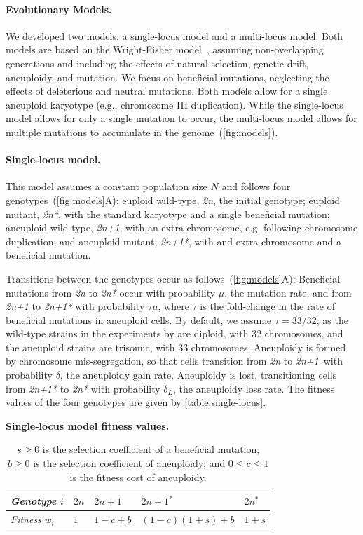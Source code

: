 \documentclass[12pt]{extarticle}
\newcommand{\euwt}{\emph{2n}}
\newcommand{\anwt}{\emph{2n+1}}
\newcommand{\eumt}{\emph{2n*}}
\newcommand{\anmt}{\emph{2n+1*}}
\begin{document}
\paragraph*{Evolutionary Models.}
We developed two models: a single-locus model and a multi-locus model. 
Both models are based on the Wright-Fisher model~\citep{Otto2007}, assuming non-overlapping generations and including the effects of natural selection, genetic drift, aneuploidy, and mutation. 
We focus on beneficial mutations, neglecting the effects of deleterious and neutral mutations. Both models allow for a single aneuploid karyotype (e.g., chromosome III duplication).
While the single-locus model allows for only a single mutation to occur, the
multi-locus model allows for multiple mutations to accumulate in the genome~(\autoref{fig:models}).

\paragraph*{Single-locus model.}
This model assumes a constant population size $N$ and follows four genotypes~(\autoref{fig:models}A): euploid wild-type, \euwt, the initial genotype; 
euploid mutant, \eumt, with the standard karyotype and a single beneficial mutation; 
aneuploid wild-type, \anwt, with an extra chromosome, e.g. following chromosome duplication; and
aneuploid mutant, \anmt, with and extra chromosome and a beneficial mutation. 

Transitions between the genotypes occur as follows~(\autoref{fig:models}A): Beneficial mutations from \euwt\; to \eumt\; occur with probability $\mu$, the mutation rate, and from \anwt\; to \anmt\; with probability $\tau \mu$, where $\tau$ is the fold-change in the rate of beneficial mutations in aneuploid cells. By default, we assume $\tau=33/32$, as the wild-type \yeast strains in the experiments by \citep{Yona2012} are diploid, with 32 chromosomes, and the aneuploid strains are trisomic, with 33 chromosomes.
Aneuploidy is formed by chromosome mis-segregation, so that cells transition from \euwt\; to \anwt\ with probability $\delta$, the aneuploidy gain rate.
Aneuploidy is lost, transitioning cells from \anmt\; to \eumt\; with probability $\delta_L$, the aneuploidy loss rate.
The fitness values of the four genotypes are given by \autoref{table:single-locus}.

\begin{table}[h]
\centering
\caption{\textbf{Single-locus model fitness values.}}
\begin{tabular}{lllll}
\emph{Genotype} $i$ & $2n$ & $2n+1$ & $2n+1^*$ & $2n^*$ \\
\hline
\emph{Fitness} $w_i$ & $1$ & $1-c+b$ & $(1-c)(1+s)+b$ & $1+s$               
\end{tabular}
\label{table:single-locus}
\caption*{
$s \ge 0$ is the selection coefficient of a beneficial mutation;
$b \ge 0$ is the selection coefficient of aneuploidy; 
and $0 \le c \le 1$ is the fitness cost of aneuploidy.
}
\end{table}
\end{document}
